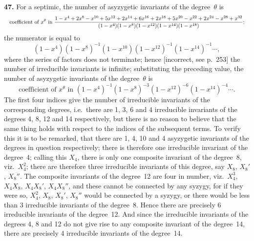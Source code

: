\documentclass[11pt]{article}
\begin{document}
\textbf{47.} For a septimic, the number of asyzygetic invariants of the degree~$\theta$ is
\[ \resizebox{\textwidth}{!}{$\displaystyle
\text{coefficient of } x^\theta \text{ in } \frac{1 - x^4 + 2x^8 - x^{10} + 5x^{12} + 2x^{14} + 6x^{16} + 2x^{18} + 5x^{20} - x^{22} + 2x^{24} - x^{28} + x^{32}}{(1-x^4)(1-x^8)(1-x^{12})(1-x^{14})(1-x^{18})};
$} \]
the numerator is equal to
\[
(1-x^4)(1-x^8)^{-1}(1-x^{10})(1-x^{12})^{-1}(1-x^{14})^{-1}\cdots,
\]
where the series of factors does not terminate; hence [incorrect, see p.~253] the number of irreducible invariants is infinite; substituting the preceding value, the number of asyzygetic invariants of the degree~$\theta$ is
\[
\text{coefficient of } x^\theta \text{ in } (1-x^4)^{-1}(1-x^8)^{-3}(1-x^{12})^{-6}(1-x^{14})^{-4}\cdots.
\]
The first four indices give the number of irreducible invariants of the corresponding degrees, i.e.\ there are 1, 3, 6 and 4 irreducible invariants of the degrees 4, 8, 12 and 14 respectively, but there is no reason to believe that the same thing holds with respect to the indices of the subsequent terms. To verify this it is to be remarked, that there are 1, 4, 10 and 4 asyzygetic invariants of the degrees in question respectively; there is therefore one irreducible invariant of the degree~4; calling this $X_4$, there is only one composite invariant of the degree~8, viz.\ $X_4^2$; there are therefore three irreducible invariants of this degree, say $X_8$, $X_8'$, $X_8''$. The composite invariants of the degree~12 are four in number, viz.\ $X_4^3$, $X_4 X_8$, $X_4 X_8'$, $X_4 X_8''$, and these cannot be connected by any syzygy, for if they were so, $X_4^2$, $X_8$, $X_8'$, $X_8''$ would be connected by a syzygy, or there would be less than 3 irreducible invariants of the degree~8. Hence there are precisely 6 irreducible invariants of the degree~12. And since the irreducible invariants of the degrees 4, 8 and 12 do not give rise to any composite invariant of the degree~14, there are precisely 4 irreducible invariants of the degree~14.
\end{document}
